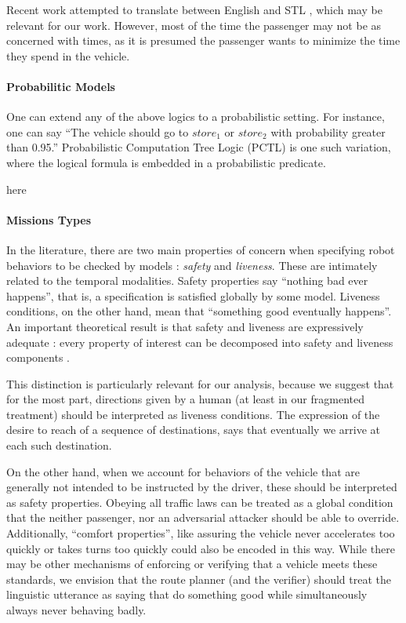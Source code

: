 \documentclass{article}
\begin{document}
Recent work attempted to translate between English and STL \cite{he2021english},
which may be relevant for our work. However, most of the time the passenger may
not be as concerned with times, as it is presumed the passenger wants to
minimize the time they spend in the vehicle.


\paragraph{Probabilitic Models}

One can extend any of the above logics to a probabilistic setting. For instance,
one can say ``The vehicle should go to $store_1$ or $store_2$ with probability
greater than 0.95.'' Probabilistic Computation Tree Logic (PCTL) is one such
variation, where the logical formula is embedded in a probabilistic predicate.


here
\cite{Sadigh-RSS-16}








\paragraph{Missions Types}

In the literature, there are two main properties of concern
when specifying robot behaviors to be checked by models : \emph{safety} and \emph{liveness}.
These are intimately related to the temporal modalities. Safety
properties say ``nothing bad ever happens'', that is, a specification is
satisfied globally by some model. Liveness conditions, on the other hand, mean
that ``something good eventually happens''. An important theoretical result is
that safety and liveness are expressively adequate : every property of interest can be
decomposed into safety and liveness components \cite{Piterman2018}.

This distinction is particularly relevant for our analysis, because we suggest
that for the most part, directions given by a human (at least in our fragmented
treatment) should be interpreted as liveness conditions. The
expression of the desire to reach of a sequence of destinations, says that
eventually we arrive at each such destination.

On the other hand, when we account for behaviors of the vehicle that are
generally not intended to be instructed by the driver, these should be
interpreted as safety properties. Obeying all traffic laws can be treated as a
global condition that the neither passenger, nor an adversarial attacker should
be able to override. Additionally, ``comfort properties'', like assuring the
vehicle never accelerates too quickly or takes turns too quickly could also be
encoded in this way. While there may be other mechanisms of enforcing or
verifying that a vehicle meets these standards, we envision that the route
planner (and the verifier) should treat the linguistic utterance as saying that
do something good while simultaneously always never behaving badly.
\end{document}
